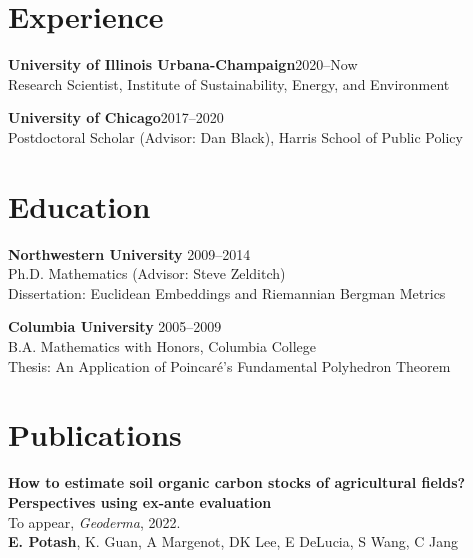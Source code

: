 \documentclass[margin,line]{resume}
\begin{document}
\address{eric@k2co3.net / \href{http://www.k2co3.net}{k2co3.net} / \href{https://github.com/potash}{github.com/potash}}
\begin{resume}
\section{\mysidestyle Experience}

	{\bf University of Illinois Urbana-Champaign}\hfill{2020--Now}\\
	Research Scientist, Institute of Sustainability, Energy, and Environment

	{\bf University of Chicago}\hfill{2017--2020}\\
	Postdoctoral Scholar (Advisor: Dan Black), Harris School of Public Policy

    \section{\mysidestyle Education}
	
	{\bf Northwestern University} \hfill {2009--2014} \\%
	Ph.D. Mathematics (Advisor: Steve Zelditch) \\
	Dissertation: Euclidean Embeddings and Riemannian Bergman Metrics

	{\bf Columbia University} \hfill {2005--2009} \\%
    B.A. Mathematics with Honors, Columbia College \\
	Thesis: An Application of Poincar\'e's Fundamental Polyhedron Theorem

	
	\section{\mysidestyle Publications}
        {\bf How to estimate soil organic carbon stocks of agricultural fields?\\Perspectives using ex-ante evaluation}\\
        To appear, \textit{Geoderma}, 2022.\\
        \textbf{E. Potash}, K. Guan, A Margenot, DK Lee, E DeLucia, S Wang, C Jang 


\end{resume}
\end{document}
